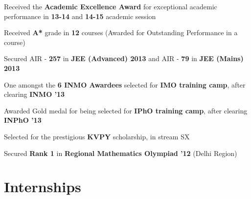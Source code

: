 \documentclass[a4paper]{norm-resume}
\begin{document}
\begin{tightitemize}
	\item Received the \textbf{Academic Excellence Award} for exceptional academic performance in \textbf{13-14} and \textbf{14-15} academic session
	\item Received \textbf{A*} grade in \textbf{12} courses (Awarded for Outstanding Performance in a course)
	\item Secured AIR - \textbf{257} in {\textbf{JEE (Advanced) 2013}} and AIR - {\textbf{79}} in \textbf{JEE (Mains) 2013}
	\item One amongst the \textbf{6 INMO Awardees} selected for \textbf{IMO training camp}, after clearing \textbf{INMO '13}
	\item Awarded Gold medal for being selected for \textbf{IPhO training camp}, after clearing \textbf{INPhO '13}
	\item Selected for the prestigious \textbf{KVPY} scholarship, in stream SX
	\item Secured \textbf{Rank 1} in \textbf{Regional Mathematics Olympiad '12} (Delhi Region)
\end{tightitemize}
	
\vspace{-1mm}	%


\section{Internships \hrulefill}
		
\vspace{0.5mm} %

 	
\vspace{0.5mm} %
	
\vspace{1.5mm} %
			
				
\vspace{0.5mm} %

\vspace{1.5mm} %
		
				
\vspace{0.5mm} %
	
\end{document}
